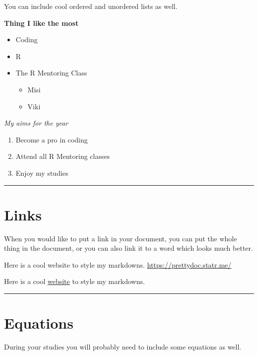 \documentclass[]{article}
\providecommand{\tightlist}{%
  \setlength{\itemsep}{0pt}\setlength{\parskip}{0pt}}
\begin{document}
You can include cool ordered and unordered lists as well.

\textbf{Thing I like the most}

\begin{itemize}
\tightlist
\item
  Coding
\item
  R
\item
  The R Mentoring Class

  \begin{itemize}
  \tightlist
  \item
    Misi
  \item
    Viki
  \end{itemize}
\end{itemize}

\emph{My aims for the year}

\begin{enumerate}
\def\labelenumi{\arabic{enumi}.}
\tightlist
\item
  Become a pro in coding
\item
  Attend all R Mentoring classes
\item
  Enjoy my studies
\end{enumerate}

\begin{center}\rule{0.5\linewidth}{0.5pt}\end{center}

\hypertarget{links}{%
\section{Links}\label{links}}

When you would like to put a link in your document, you can put the
whole thing in the document, or you can also link it to a word which
looks much better.

Here is a cool website to style my markdowns.
\url{https://prettydoc.statr.me/}

Here is a cool \href{https://prettydoc.statr.me/}{website} to style my
markdowns.

\begin{center}\rule{0.5\linewidth}{0.5pt}\end{center}

\hypertarget{equations}{%
\section{Equations}\label{equations}}

During your studies you will probably need to include some equations as
well.
\end{document}
